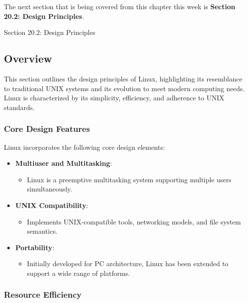 The next section that is being covered from this chapter this week is \textbf{Section 20.2: Design Principles}.

\begin{notes}{Section 20.2: Design Principles}
    \subsection*{Overview}

    This section outlines the design principles of Linux, highlighting its resemblance to traditional UNIX systems and its evolution to meet modern computing needs. Linux is characterized by its 
    simplicity, efficiency, and adherence to UNIX standards.
    
    \subsubsection*{Core Design Features}
    
    Linux incorporates the following core design elements:
    \begin{itemize}
        \item \textbf{Multiuser and Multitasking}:
        \begin{itemize}
            \item Linux is a preemptive multitasking system supporting multiple users simultaneously.
        \end{itemize}
        \item \textbf{UNIX Compatibility}:
        \begin{itemize}
            \item Implements UNIX-compatible tools, networking models, and file system semantics.
        \end{itemize}
        \item \textbf{Portability}:
        \begin{itemize}
            \item Initially developed for PC architecture, Linux has been extended to support a wide range of platforms.
        \end{itemize}
    \end{itemize}
    
    \subsubsection*{Resource Efficiency}
    

\end{notes}

